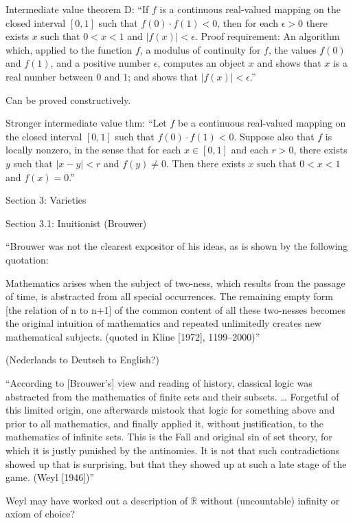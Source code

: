 Intermediate value theorem D:
``If $f$ is a continuous real-valued mapping 
on the closed interval $[0,1]$ 
such that $f(0)⋅f(1)<0$, 
then for each $\epsilon>0$ 
there exists $x$ such that $0<x<1$ and $|f(x)|<\epsilon$.
Proof requirement: 
An algorithm which, applied to the function $f$, 
a modulus of continuity for $f$, the values $f(0)$ and $f(1)$, 
and a positive number $\epsilon$,
computes an object $x$ 
and shows that $x$ is a real number between $0$ and $1$; and
shows that $|f(x)|<\epsilon$.''~\cite{sep:mathematics_constructive}

Can be proved constructively.

Stronger intermediate value thm:
``Let $f$ be a continuous real-valued mapping 
on the closed interval $[0,1]$ 
such that $f(0)⋅f(1)<0$. 
Suppose also that $f$ is locally nonzero, 
in the sense that for each $x \in [0,1]$
and each $r>0$, 
there exists $y$ such that $|x−y|<r$ and $f(y) \neq 0$. 
Then there exists $x$ such that $0<x<1$ and $f(x)=0$.''

Section 3: Varieties

Section 3.1: Inuitionist (Brouwer)

``Brouwer was not the clearest expositor of his ideas, 
as is shown by the following quotation:

Mathematics arises when the subject of two-ness, 
which results from the passage of time, 
is abstracted from all special occurrences. 
The remaining empty form [the relation of n to n+1] 
of the common content of all these two-nesses 
becomes the original intuition of mathematics 
and repeated unlimitedly creates new mathematical subjects. 
(quoted in Kline [1972], 1199–2000)''

(Nederlands to Deutsch to English?)

``According to [Brouwer’s] view and reading of history, 
classical logic was abstracted 
from the mathematics of finite sets and their subsets. \ldots 
Forgetful of this limited origin, 
one afterwards mistook that logic 
for something above and prior to all mathematics, 
and finally applied it, without justification, 
to the mathematics of infinite sets. 
This is the Fall and original sin of set theory, 
for which it is justly punished by the antinomies. 
It is not that such contradictions showed up that is surprising,
 but that they showed up at such a late stage of the game. 
 (Weyl [1946])''
 
Weyl may have worked out a description of
$\mathbb{R}$ without (uncountable) infinity or
axiom of choice?

